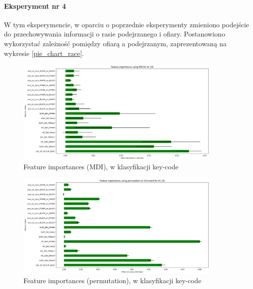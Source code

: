 \documentclass{classrep}
\begin{document}
{{{                \paragraph{Eksperyment nr 4}{
                    W tym eksperymencie, w oparciu o poprzednie eksperymenty zmieniono podejście do przechowywania informacji o rasie podejrzanego i ofiary. Postanowiono wykorzystać zależność pomiędzy ofiarą a podejrzanym, zaprezentowaną na wykresie \ref{pie_chart_race}.
                    \begin{figure}[!htbp]
                        \centering
                        \includegraphics[width=0.9\textwidth]{img/5.1.3/4/Feature importances using MDI for KY_CD.png}
                        \caption{Feature importances (MDI), w klasyfikacji key-code}
                        \label{goal_1_exp_4_imp_mdi_key}
                    \end{figure}
                    
                    \begin{figure}[!htbp]
                        \centering
                        \includegraphics[width=0.9\textwidth]{img/5.1.3/4/Feature importances using permutation on full model for KY_CD.png}
                        \caption{Feature importances (permutation), w klasyfikacji key-code}
                        \label{goal_1_exp_4_imp_perm_key}
                    \end{figure}
                    
}}}}
\end{document}
